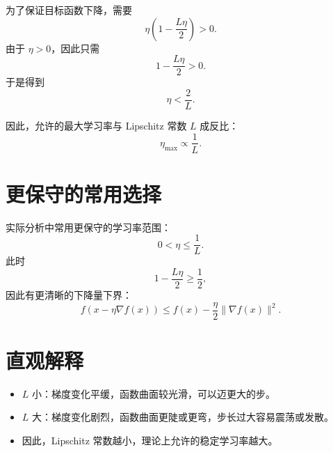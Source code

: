 \documentclass[11pt,fontset=fandol]{ctexart}
\begin{document}
为了保证目标函数下降，需要
\[
  \eta\left(1-\frac{L\eta}{2}\right)>0.
\]
由于 \(\eta>0\)，因此只需
\[
  1-\frac{L\eta}{2}>0.
\]
于是得到
\[
  \eta<\frac{2}{L}.
\]

因此，允许的最大学习率与 Lipschitz 常数 \(L\) 成反比：
\[
  \eta_{\max}\propto \frac{1}{L}.
\]

\section{更保守的常用选择}

实际分析中常用更保守的学习率范围：
\[
  0<\eta\le \frac{1}{L}.
\]
此时
\[
  1-\frac{L\eta}{2}\ge \frac{1}{2},
\]
因此有更清晰的下降量下界：
\[
  f(x-\eta\nabla f(x))
  \le
  f(x)-\frac{\eta}{2}\|\nabla f(x)\|^2.
\]

\section{直观解释}

\begin{itemize}
  \item \(L\) 小：梯度变化平缓，函数曲面较光滑，可以迈更大的步。
  \item \(L\) 大：梯度变化剧烈，函数曲面更陡或更弯，步长过大容易震荡或发散。
  \item 因此，Lipschitz 常数越小，理论上允许的稳定学习率越大。
\end{itemize}
\end{document}
